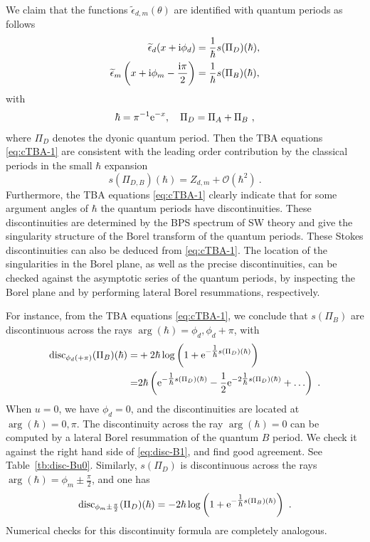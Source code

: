 \documentclass[a4paper,11pt]{article}
\theoremstyle{definition}
\newcommand{\re}{{\rm e}}
\newcommand{\ri}{{\rm i}}
\def\mc{\mathcal}
\def\({\left(}
\def\){\right)}
\newcommand{\nn}{\nonumber \\}
\begin{document}
We claim that the functions $\widetilde \epsilon_{d,m}(\theta)$ are
identified with quantum periods as follows
%
\begin{equation}\label{eq:TBA-dict-1}
  \begin{aligned}
    \widetilde \epsilon_d(x+\ri\phi_d)
    &= \frac{1}{\hbar}s(\Pi_D)(\hbar),\\
    \widetilde \epsilon_m\left(x+\ri\phi_m-\frac{\ri\pi}{2}\right)
    &= \frac{1}{\hbar} s(\Pi_B)(\hbar),
  \end{aligned}
\end{equation}
%
with 
%
\begin{equation}
  \hbar = \pi^{-1}\re^{-x}, \quad \Pi_D=\Pi_A+\Pi_B \ ,
\end{equation}
%
where $\Pi_D$ denotes the dyonic quantum period. Then the TBA
equations \eqref{eq:cTBA-1} are consistent with the leading order
contribution by the classical periods in the small $\hbar$ expansion
%
\begin{equation}
  s(\Pi_{D,B})(\hbar) = Z_{d,m} + \mc O(\hbar^2) \ .
\end{equation}
%
Furthermore, the TBA equations \eqref{eq:cTBA-1} clearly indicate that
for some argument angles of $\hbar$ the quantum periods have
discontinuities. These discontinuities are determined by the BPS
spectrum of SW theory and give the singularity structure of the Borel
transform of the quantum periods. These Stokes discontinuities can
also be deduced from \eqref{eq:cTBA-1}. The location of the
singularities in the Borel plane, as well as the precise
discontinuities, can be checked against the asymptotic series of the
quantum periods, by inspecting the Borel plane and by performing
lateral Borel resummations, respectively.

For instance, from the TBA equations \eqref{eq:cTBA-1}, we conclude
that $s(\Pi_B)$ are discontinuous across the rays
$\arg(\hbar) = \phi_d, \phi_d+\pi$, with 
%
\begin{align}
  \text{disc}_{\phi_d(+\pi)} (\Pi_B)(\hbar)
  =
  & +2\hbar\log\left(1+\re^{-\tfrac{1}{\hbar} s(\Pi_D)(\hbar)}\right) \nn
    =
  & 2\hbar\(\re^{-\tfrac{1}{\hbar} s(\Pi_D)(\hbar)} -
    \frac{1}{2}\re^{-2\tfrac{1}{\hbar} s(\Pi_D)(\hbar)} + \ldots\) \ .
    \label{eq:disc-B1}
\end{align}
%
When $u=0$, we have $\phi_d=0$, and the discontinuities are located at
$\arg(\hbar) = 0,\pi$. 
The discontinuity across the ray $\arg(\hbar) = 0$ can be computed by
a lateral Borel resummation of the quantum $B$ period. We check it
against the right hand side of \eqref{eq:disc-B1}, and find good
agreement. See Table~\ref{tb:disc-Bu0}. Similarly, $s(\Pi_D)$ is
discontinuous across the rays $\arg(\hbar) = \phi_m\pm\frac{\pi}{2}$,
and one has
%
\begin{equation}
  \text{disc}_{\phi_m\pm\frac{\pi}{2}} (\Pi_D)(\hbar)
  = -2\hbar
  \log\left(1+\re^{-\tfrac{1}{\hbar} s(\Pi_B)(\hbar)}\right) \ .
\end{equation}
%
 Numerical checks for this discontinuity formula are
completely analogous.
\end{document}
